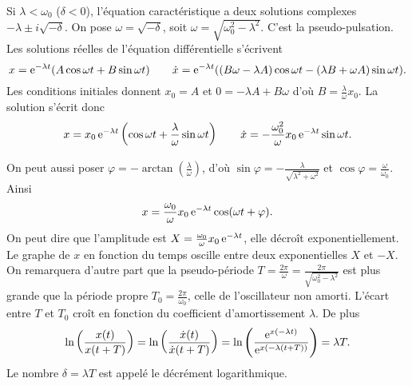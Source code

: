 Si \(\lambda < \omega_0\) (\(\delta < 0\)), l'équation caractéristique a deux 
solutions complexes \(-\lambda \pm i\sqrt{-\delta}\). On pose \(\omega = 
\sqrt{-\delta}\), soit \(\omega = \sqrt{\omega_0^2-\lambda^2}\). C'est la 
pseudo-pulsation. Les solutions réelles de l'équation différentielle s'écrivent
\begin{equation}%
  x = \e^{-\lambda t}(A\cos\omega t + B\sin\omega t) \qquad \dot x = 
  \e^{-\lambda t}((B\omega -\lambda A)\cos\omega t - (\lambda B + \omega 
  A)\sin\omega t).
\end{equation}%
Les conditions initiales donnent \(x_0=A\) et \(0 = -\lambda A + B \omega\) 
d'où \(B = \frac{\lambda}{\omega}x_0\). La solution s'écrit donc
\begin{equation}%
  x = x_0 \e^{-\lambda t}\left(\cos \omega t + \frac{\lambda}{\omega}\sin\omega 
  t\right) \qquad \dot x = -\frac{\omega_0^2}{\omega}x_0 \e^{-\lambda t}\sin 
  \omega t.
\end{equation}%

On peut aussi poser \(\varphi = -\arctan\left(\frac{\lambda}{\omega}\right)\), 
d'où \(\sin\varphi = -\frac{\lambda}{\sqrt{\lambda^2+\omega^2}}\) et 
\(\cos\varphi = \frac{\omega}{\omega_0}\). Ainsi
\begin{equation}%
  x = \frac{\omega_0}{\omega}x_0 \e^{-\lambda t} \cos(\omega t + \varphi).
\end{equation}%
%
On peut dire que l'amplitude est \(X = \frac{\omega_0}{\omega}x_0 \operatorname{e}^{-\lambda 
t}\), elle décroît exponentiellement. Le graphe de \(x\) en fonction du temps 
oscille entre deux exponentielles \(X\) et \(-X\). On remarquera d'autre part 
que la pseudo-période \(T = \frac{2\pi}{\omega} = 
\frac{2\pi}{\sqrt{\omega_0^2-\lambda^2}}\) est plus grande que la période 
propre \(T_0 = \frac{2\pi}{\omega_0}\), celle de l'oscillateur non amorti. 
L'écart entre \(T\) et \(T_0\) croît en fonction du coefficient d'amortissement 
\(\lambda\). De plus
\begin{equation}%
  \ln\left(\frac{x(t)}{x(t+T)}\right) = \ln\left(\frac{\dot x(t)}{\dot 
  x(t+T)}\right) = \ln\left(\frac{\e^{x(-\lambda t)}}{\e^{x(-\lambda 
  (t+T))}}\right) = \lambda T.
\end{equation}%
Le nombre \(\delta = \lambda T\) est appelé le décrément logarithmique.
%
